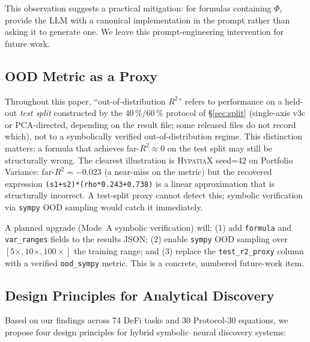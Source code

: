 \documentclass[twoside,11pt]{article}
\newcommand{\Rsq}{R^{2}}
\begin{document}
This observation suggests a practical mitigation: for formulas containing $\Phi$,
provide the LLM with a canonical implementation in the prompt rather than asking it
to generate one.  We leave this prompt-engineering intervention for future work.

\subsection{OOD Metric as a Proxy}\label{subsec:ood-metric-as-a-proxy}
\label{sec:ood_proxy}

Throughout this paper, ``out-of-distribution $\Rsq$'' refers to performance on a
held-out \emph{test split} constructed by the 40\,\%/60\,\% protocol of
\S\ref{sec:split} (single-axis v3c or PCA-directed, depending on the result
file; some released files do not record which), not to a
symbolically verified out-of-distribution regime.  This distinction matters: a
formula that achieves far-$\Rsq \approx 0$ on the test split may still be
structurally wrong.  The clearest illustration is \textsc{HypatiaX} seed=42 on
Portfolio Variance: far-$\Rsq = -0.023$ (a near-miss on the metric) but the
recovered expression \texttt{(s1+s2)*(rho*0.243+0.738)} is a linear approximation
that is structurally incorrect.  A test-split proxy cannot detect this; symbolic
verification via \texttt{sympy} OOD sampling would catch it immediately.

A planned upgrade (Mode~A symbolic verification) will: (1) add \texttt{formula} and
\texttt{var\_ranges} fields to the results JSON; (2) enable \texttt{sympy} OOD
sampling over $[5\times, 10\times, 100\times]$ the training range; and (3) replace
the \texttt{test\_r2\_proxy} column with a verified \texttt{ood\_sympy} metric.
This is a concrete, numbered future-work item. 

\subsection{Design Principles for Analytical Discovery}\label{subsec:design-principles-for-analytical-discove}
\label{sec:disc_principles}

Based on our findings across 74 DeFi tasks and 30 Protocol-30 equations, we propose four design principles for hybrid symbolic--neural discovery systems:
\end{document}
